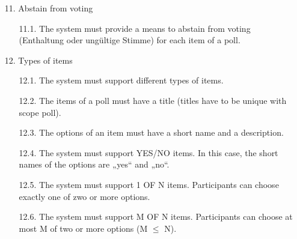 \begin{enumerate}
\item[11.] Abstain from voting

	\begin{enumerate}
	\item[11.1.] The system must provide a means to abstain from voting (Enthaltung oder ungültige
	Stimme) for each item of a poll. %
	
	
	
	\end{enumerate}



\item[12.] Types of items

	\begin{enumerate}
	\item[12.1.] The system must support different types of items. %
	
	
	\item[12.2.] The items of a poll must have a title (titles have to be unique with scope poll). %
	
	
	\item[12.3.] The options of an item must have a short name and a description. %
	
	
	\item[12.4.] The system must support YES/NO items. In this case, the short names of the options are
	„yes“ and „no“. %
	
	
	\item[12.5.] The system must support 1 OF N items. Participants can choose exactly one of zwo or
	more options. %
	
	
	\item[12.6.] The system must support M OF N items. Participants can choose at most M of two or
	more options (M $\leq$ N). %
	
	
	
	
	\end{enumerate}





\end{enumerate}
